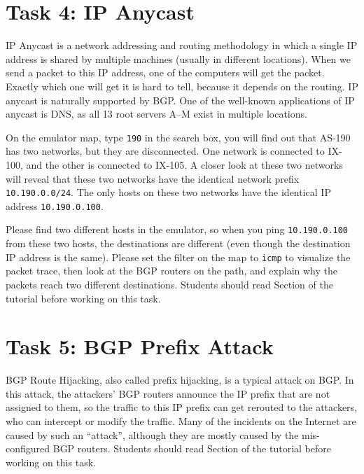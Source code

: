 \section{Task 4: IP Anycast} 

IP Anycast is a network addressing and routing methodology in which a single
IP address is shared by multiple machines (usually in different locations).
When we send a packet to this IP address, one of the computers will get 
the packet. Exactly which one will get it is hard to tell, because it depends
on the routing. IP anycast is naturally supported by BGP. 
One of the well-known applications of IP anycast is DNS, 
as all 13 root servers A–M exist in multiple locations. 


On the emulator map, type \texttt{190} in the search box, you will find 
out that AS-190 has two networks, but they are disconnected. One network
is connected to IX-100, and the other is connected to IX-105. A closer 
look at these two networks will reveal that these two networks have the 
identical network prefix \texttt{10.190.0.0/24}. The only hosts on
these two networks have the identical IP address \texttt{10.190.0.100}. 

Please find two different hosts in the emulator, so 
when you ping \texttt{10.190.0.100} from these two hosts, 
the destinations are different (even though the destination
IP address is the same). Please set the filter on the map to
\texttt{icmp} to visualize the packet trace, then 
look at the BGP routers on the path, and explain why
the packets reach two different destinations. 
Students should read Section \ipanycast of the tutorial 
before working on this task.



\section{Task 5: BGP Prefix Attack} 

BGP Route Hijacking, also called prefix hijacking, is a typical
attack on BGP. In this attack, the attackers' BGP routers 
announce the IP prefix that are not assigned to them, so
the traffic to this IP prefix can get rerouted to the 
attackers, who can intercept or modify the traffic.
Many of the incidents on the Internet are caused by
such an ``attack'', although they are mostly caused 
by the mis-configured BGP routers.
Students should read Section \bgphijacking of the tutorial 
before working on this task.


